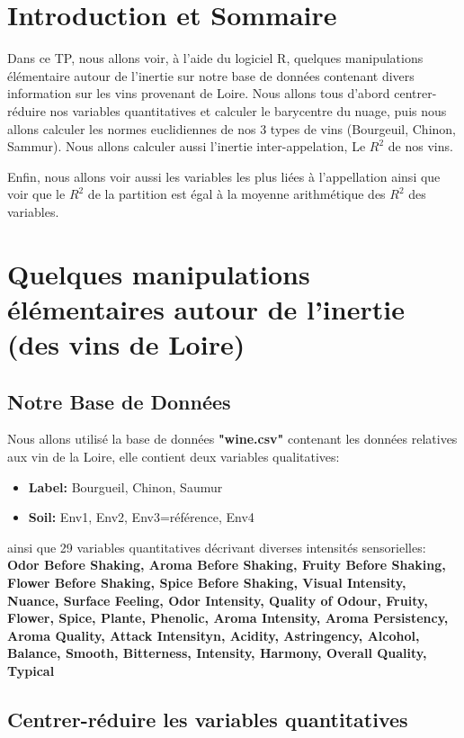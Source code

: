 \chapter*{Introduction et Sommaire}
Dans ce TP, nous allons voir, à l'aide du logiciel R, quelques manipulations élémentaire autour de l'inertie sur notre base de données contenant divers information sur les vins provenant de Loire.
Nous allons tous d'abord centrer-réduire nos variables quantitatives et calculer le barycentre du nuage, puis nous allons calculer les normes euclidiennes  de nos 3 types de vins (Bourgeuil, Chinon, Sammur). Nous allons calculer aussi l'inertie inter-appelation, Le $R^2$ de nos vins.

Enfin, nous allons voir aussi les variables les plus liées à l'appellation ainsi que voir que le $R^2$ de la partition est égal à la moyenne arithmétique des $R^2$ des variables.
\chapter{Quelques manipulations élémentaires
autour de l'inertie (des vins de Loire)}
\section{Notre Base de Données}
Nous allons utilisé la base de données \textbf{"wine.csv"} contenant les données relatives aux vin de la Loire, elle contient deux variables qualitatives:
\begin{itemize}
    \item \textbf{Label:} Bourgueil, Chinon, Saumur
    \item \textbf{Soil:} Env1, Env2, Env3=référence, Env4
\end{itemize}
ainsi que 29 variables quantitatives décrivant diverses intensités sensorielles:  \textbf{Odor Before Shaking, Aroma Before Shaking, Fruity Before Shaking, Flower Before Shaking, Spice Before Shaking, Visual Intensity, Nuance, Surface Feeling, Odor Intensity, Quality of Odour, Fruity, Flower, Spice, Plante, Phenolic, Aroma Intensity, Aroma Persistency, Aroma Quality, Attack Intensityn, Acidity, Astringency, Alcohol, Balance, Smooth, Bitterness, Intensity, Harmony, Overall Quality, Typical}

\section{Centrer-réduire les variables quantitatives}

